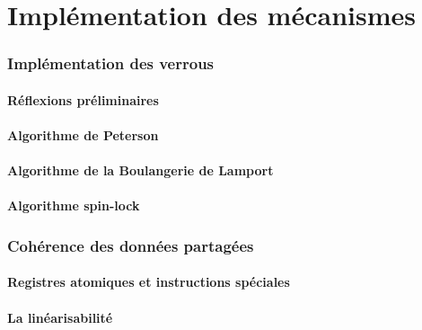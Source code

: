  
\part{Implémentation des mécanismes}
 
 
\section{Implémentation des verrous}
 
\subsection{Réflexions préliminaires}




 
\subsection{Algorithme de Peterson}

 
\subsection{Algorithme de la Boulangerie de Lamport}


 
\subsection{Algorithme spin-lock}

 
 
\section{Cohérence des données partagées}
 
\subsection{Registres atomiques et instructions spéciales}



 
\subsection{La linéarisabilité}







 
